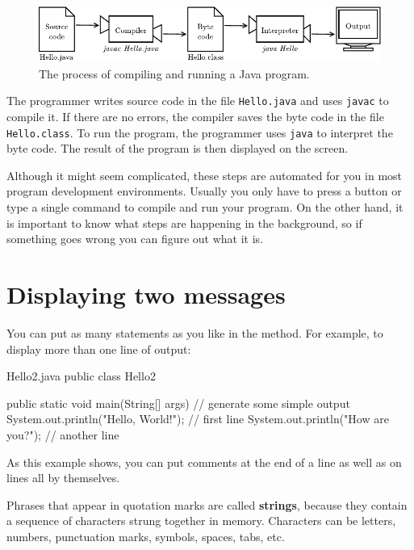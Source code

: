 \begin{figure}[!ht]
\begin{center}
\includegraphics{figs/compiler.pdf}
\caption{The process of compiling and running a Java program.}
\label{fig.compiler}
\end{center}
\end{figure}

The programmer writes source code in the file {\tt Hello.java} and uses {\tt javac} to compile it.
If there are no errors, the compiler saves the byte code in the file {\tt Hello.class}.
To run the program, the programmer uses {\tt java} to interpret the byte code.
The result of the program is then displayed on the screen.

Although it might seem complicated, these steps are automated for you in most program development environments.
Usually you only have to press a button or type a single command to compile and run your program.
On the other hand, it is important to know what steps are happening in the background, so if something goes wrong you can figure out what it is.


\section{Displaying two messages}

You can put as many statements as you like in the  method.
For example, to display more than one line of output:

\begin{trinket}[250]{Hello2.java}
public class Hello2 {

    public static void main(String[] args) {
        // generate some simple output
        System.out.println("Hello, World!");  // first line
        System.out.println("How are you?");   // another line
    }
}
\end{trinket}

As this example shows, you can put comments at the end of a line as well as on lines all by themselves.


Phrases that appear in quotation marks are called {\bf strings}, because they contain a sequence of characters strung together in memory.
Characters can be letters, numbers, punctuation marks, symbols, spaces, tabs, etc.

